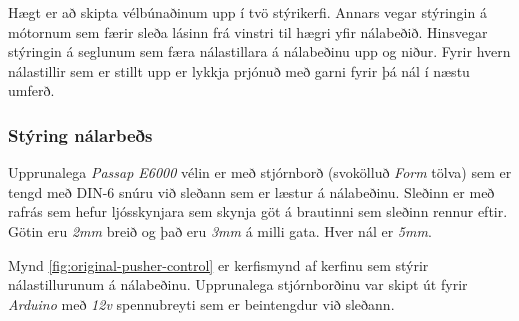 Hægt er að skipta vélbúnaðinum upp í tvö stýrikerfi. Annars vegar stýringin á mótornum sem færir sleða lásinn frá vinstri til hægri yfir nálabeðið. Hinsvegar stýringin á seglunum sem færa nálastillara á nálabeðinu upp og niður. Fyrir hvern nálastillir sem er stillt upp er lykkja prjónuð með garni fyrir þá nál í næstu umferð.
\subsubsection{Stýring nálarbeðs}
Upprunalega \textit{Passap E6000} vélin er með stjórnborð (svokölluð \textit{Form} tölva) sem er tengd með DIN-6 snúru við sleðann sem er læstur á nálabeðinu. Sleðinn er
með rafrás sem hefur ljósskynjara sem skynja göt á brautinni sem sleðinn rennur eftir. Götin eru \textit{2mm} breið og það eru \textit{3mm} á milli gata. Hver nál er \textit{5mm}. 

Mynd \ref{fig:original-pusher-control} er kerfismynd af kerfinu sem stýrir nálastillurunum á nálabeðinu. Upprunalega stjórnborðinu var skipt út fyrir \textit{Arduino} með \textit{12v} spennubreyti sem er beintengdur við sleðann.

